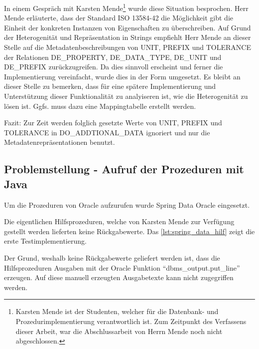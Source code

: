 In einem Gespräch mit Karsten Mende\footnote{Karsten Mende ist der Studenten, welcher für die Datenbank- und Prozedurimplementierung verantwortlich ist. Zum Zeitpunkt des Verfassens dieser Arbeit, war die Abschlussarbeit von Herrn Mende noch nicht abgeschlossen.} wurde diese Situation besprochen. Herr Mende erläuterte, dass der Standard ISO 13584-42 \citep[vgl.][]{iso13584-42} die Möglichkeit gibt die Einheit der konkreten Instanzen von Eigenschaften zu überschreiben. Auf Grund der Heterogenität und Repräsentation in Strings empfiehlt Herr Mende an dieser Stelle auf die Metadatenbeschreibungen von UNIT, PREFIX und TOLERANCE der Relationen DE\_PROPERTY, DE\_DATA\_TYPE, DE\_UNIT und DE\_PREFIX zurückzugreifen. 
Da dies sinnvoll erscheint und ferner die Implementierung vereinfacht, wurde dies in der Form umgesetzt. Es bleibt an dieser Stelle zu bemerken, dass für eine spätere Implementierung und Unterstützung dieser Funktionalität zu analyiseren ist, wie die Heterogenität zu lösen ist. Ggfs. muss dazu eine Mappingtabelle erstellt werden.

Fazit:
Zur Zeit werden folglich gesetzte Werte von UNIT, PREFIX und TOLERANCE in DO\_ADDTIONAL\_DATA ignoriert und nur die Metadatenrepräsentationen benutzt.  

\subsection{Problemstellung - Aufruf der Prozeduren mit Java}
Um die Prozeduren von Oracle aufzurufen wurde Spring Data Oracle eingesetzt. 

Die eigentlichen Hilfsprozeduren, welche von Karsten Mende zur Verfügung gestellt werden lieferten keine Rückgabewerte. Das \autoref{lst:spring_data_hilf} zeigt die erste Testimplementierung. 

Der Grund, weshalb keine Rückgabewerte geliefert werden ist, dass die Hilfsprozeduren Ausgaben mit der Oracle Funktion \enquote{dbms\_output.put\_line} erzeugen. Auf diese manuell erzeugten Ausgabetexte kann nicht zugegriffen werden. 

